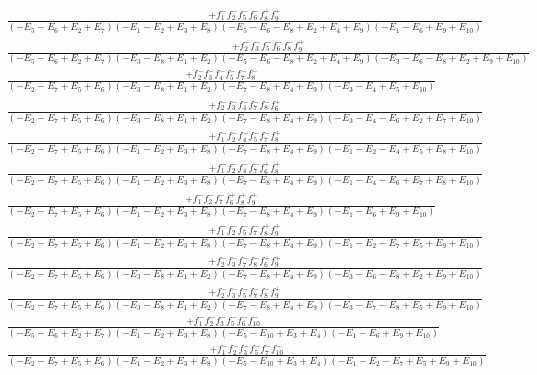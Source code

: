 \documentclass{article}
\begin{document}
\[\begin{array}{rcl}
\frac{+f_{1}^{-}f_{2}^{-}f_{5}^{-}f_{6}^{-}f_{8}^{+}f_{9}^{+}}{(-E_{5}-E_{6}+E_{2}+E_{7})(-E_{1}-E_{2}+E_{3}+E_{8})(-E_{5}-E_{6}-E_{8}+E_{2}+E_{4}+E_{9})(-E_{1}-E_{6}+E_{9}+E_{10})}\\
\frac{+f_{2}^{-}f_{3}^{-}f_{5}^{-}f_{6}^{-}f_{8}^{-}f_{9}^{+}}{(-E_{5}-E_{6}+E_{2}+E_{7})(-E_{3}-E_{8}+E_{1}+E_{2})(-E_{5}-E_{6}-E_{8}+E_{2}+E_{4}+E_{9})(-E_{3}-E_{6}-E_{8}+E_{2}+E_{9}+E_{10})}\\
\frac{+f_{2}^{-}f_{3}^{-}f_{4}^{-}f_{5}^{-}f_{7}^{-}f_{8}^{-}}{(-E_{2}-E_{7}+E_{5}+E_{6})(-E_{3}-E_{8}+E_{1}+E_{2})(-E_{7}-E_{8}+E_{4}+E_{9})(-E_{3}-E_{4}+E_{5}+E_{10})}\\
\frac{+f_{2}^{-}f_{3}^{-}f_{4}^{-}f_{7}^{-}f_{8}^{-}f_{6}^{+}}{(-E_{2}-E_{7}+E_{5}+E_{6})(-E_{3}-E_{8}+E_{1}+E_{2})(-E_{7}-E_{8}+E_{4}+E_{9})(-E_{3}-E_{4}-E_{6}+E_{2}+E_{7}+E_{10})}\\
\frac{+f_{1}^{-}f_{2}^{-}f_{4}^{-}f_{5}^{-}f_{7}^{-}f_{8}^{+}}{(-E_{2}-E_{7}+E_{5}+E_{6})(-E_{1}-E_{2}+E_{3}+E_{8})(-E_{7}-E_{8}+E_{4}+E_{9})(-E_{1}-E_{2}-E_{4}+E_{5}+E_{8}+E_{10})}\\
\frac{+f_{1}^{-}f_{2}^{-}f_{4}^{-}f_{7}^{-}f_{6}^{+}f_{8}^{+}}{(-E_{2}-E_{7}+E_{5}+E_{6})(-E_{1}-E_{2}+E_{3}+E_{8})(-E_{7}-E_{8}+E_{4}+E_{9})(-E_{1}-E_{4}-E_{6}+E_{7}+E_{8}+E_{10})}\\
\frac{+f_{1}^{-}f_{2}^{-}f_{7}^{-}f_{6}^{+}f_{8}^{+}f_{9}^{+}}{(-E_{2}-E_{7}+E_{5}+E_{6})(-E_{1}-E_{2}+E_{3}+E_{8})(-E_{7}-E_{8}+E_{4}+E_{9})(-E_{1}-E_{6}+E_{9}+E_{10})}\\
\frac{+f_{1}^{-}f_{2}^{-}f_{5}^{-}f_{7}^{-}f_{8}^{+}f_{9}^{+}}{(-E_{2}-E_{7}+E_{5}+E_{6})(-E_{1}-E_{2}+E_{3}+E_{8})(-E_{7}-E_{8}+E_{4}+E_{9})(-E_{1}-E_{2}-E_{7}+E_{5}+E_{9}+E_{10})}\\
\frac{+f_{2}^{-}f_{3}^{-}f_{7}^{-}f_{8}^{-}f_{6}^{+}f_{9}^{+}}{(-E_{2}-E_{7}+E_{5}+E_{6})(-E_{3}-E_{8}+E_{1}+E_{2})(-E_{7}-E_{8}+E_{4}+E_{9})(-E_{3}-E_{6}-E_{8}+E_{2}+E_{9}+E_{10})}\\
\frac{+f_{2}^{-}f_{3}^{-}f_{5}^{-}f_{7}^{-}f_{8}^{-}f_{9}^{+}}{(-E_{2}-E_{7}+E_{5}+E_{6})(-E_{3}-E_{8}+E_{1}+E_{2})(-E_{7}-E_{8}+E_{4}+E_{9})(-E_{3}-E_{7}-E_{8}+E_{5}+E_{9}+E_{10})}\\
\frac{+f_{1}^{-}f_{2}^{-}f_{3}^{-}f_{5}^{-}f_{6}^{-}f_{10}^{-}}{(-E_{5}-E_{6}+E_{2}+E_{7})(-E_{1}-E_{2}+E_{3}+E_{8})(-E_{5}-E_{10}+E_{3}+E_{4})(-E_{1}-E_{6}+E_{9}+E_{10})}\\
\frac{+f_{1}^{-}f_{2}^{-}f_{3}^{-}f_{5}^{-}f_{7}^{-}f_{10}^{-}}{(-E_{2}-E_{7}+E_{5}+E_{6})(-E_{1}-E_{2}+E_{3}+E_{8})(-E_{5}-E_{10}+E_{3}+E_{4})(-E_{1}-E_{2}-E_{7}+E_{5}+E_{9}+E_{10})}\\

\end{array}\]
\end{document}
